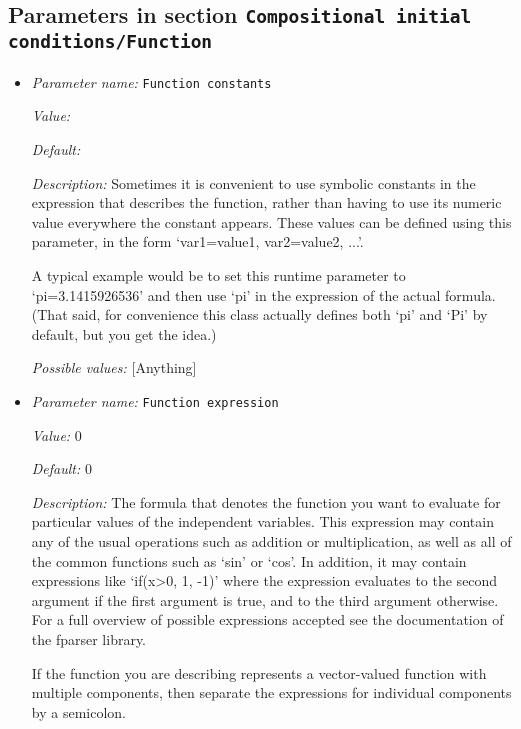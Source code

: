 \subsection{Parameters in section \tt Compositional initial conditions/Function}
\label{parameters:Compositional_20initial_20conditions/Function}

\begin{itemize}
\item {\it Parameter name:} {\tt Function constants}


{\it Value:} 


{\it Default:} 


{\it Description:} Sometimes it is convenient to use symbolic constants in the expression that describes the function, rather than having to use its numeric value everywhere the constant appears. These values can be defined using this parameter, in the form `var1=value1, var2=value2, ...'.

A typical example would be to set this runtime parameter to `pi=3.1415926536' and then use `pi' in the expression of the actual formula. (That said, for convenience this class actually defines both `pi' and `Pi' by default, but you get the idea.)


{\it Possible values:} [Anything]
\item {\it Parameter name:} {\tt Function expression}


{\it Value:} 0


{\it Default:} 0


{\it Description:} The formula that denotes the function you want to evaluate for particular values of the independent variables. This expression may contain any of the usual operations such as addition or multiplication, as well as all of the common functions such as `sin' or `cos'. In addition, it may contain expressions like `if(x>0, 1, -1)' where the expression evaluates to the second argument if the first argument is true, and to the third argument otherwise. For a full overview of possible expressions accepted see the documentation of the fparser library.

If the function you are describing represents a vector-valued function with multiple components, then separate the expressions for individual components by a semicolon.



\end{itemize}
